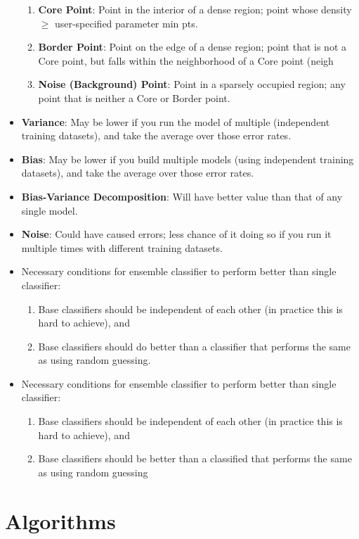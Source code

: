 \documentclass[fontsize=4pt]{scrartcl}
\begin{document}
\begin{multicols}{3}
\begin{itemize}
\begin{enumerate}
			\item {\bf Core Point}: Point in the interior of a dense region; point whose density $\geq$ user-specified parameter min pts.
			\item {\bf Border Point}: Point on the edge of a dense region; point that is not a Core point, but falls within the neighborhood of a Core point (neigh
			\item {\bf Noise (Background) Point}: Point in a sparsely occupied region; any point that is neither a Core or Border point. 
		\end{enumerate}
	\item {\bf Variance}: May be lower if you run the model of multiple (independent training datasets), and take the average over those error rates.
	\item {\bf Bias}: May be lower if you build multiple models (using independent training datasets), and take the average over those error rates. 
	\item {\bf Bias-Variance Decomposition}: Will have better value than that of any single model.
	\item {\bf Noise}: Could have caused errors; less chance of it doing so if you run it multiple times with different training datasets.
	\item Necessary conditions for ensemble classifier to perform better than single classifier:
		\begin{enumerate}
			\item Base classifiers should be independent of each other (in practice this is hard to 
achieve), and
			\item Base classifiers should do better than a classifier that performs the same as using random guessing.
		\end{enumerate}
 	\item Necessary conditions for ensemble classifier to perform better than single classifier:
		\begin{enumerate}
			\item Base classifiers should be independent of each other (in practice this is hard to 
achieve), and
			\item Base classifiers should be better than a classified that performs the same as using random guessing
		\end{enumerate}
\end{itemize}

\section{Algorithms}


\end{multicols}
\end{document}
